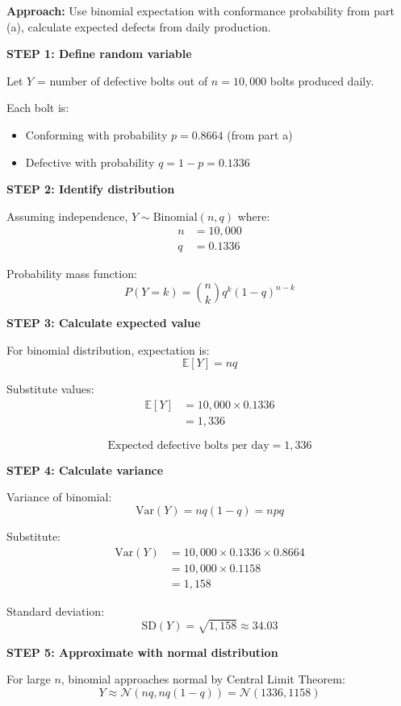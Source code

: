 \documentclass[12pt]{article}
\begin{document}
\begin{solution}

\textbf{Approach:} Use binomial expectation with conformance probability from part (a), calculate expected defects from daily production.

\textbf{STEP 1: Define random variable}

Let $Y$ = number of defective bolts out of $n = 10,000$ bolts produced daily.

Each bolt is:
\begin{itemize}
    \item Conforming with probability $p = 0.8664$ (from part a)
    \item Defective with probability $q = 1 - p = 0.1336$
\end{itemize}

\textbf{STEP 2: Identify distribution}

Assuming independence, $Y \sim \text{Binomial}(n, q)$ where:
\begin{align*}
n &= 10,000 \\
q &= 0.1336
\end{align*}

Probability mass function:
\[
P(Y = k) = \binom{n}{k}q^k(1-q)^{n-k}
\]

\textbf{STEP 3: Calculate expected value}

For binomial distribution, expectation is:
\[
\mathbb{E}[Y] = nq
\]

Substitute values:
\begin{align*}
\mathbb{E}[Y] &= 10,000 \times 0.1336 \\
&= 1,336
\end{align*}

\[
\boxed{\text{Expected defective bolts per day} = 1,336}
\]

\textbf{STEP 4: Calculate variance}

Variance of binomial:
\[
\text{Var}(Y) = nq(1-q) = npq
\]

Substitute:
\begin{align*}
\text{Var}(Y) &= 10,000 \times 0.1336 \times 0.8664 \\
&= 10,000 \times 0.1158 \\
&= 1,158
\end{align*}

Standard deviation:
\[
\text{SD}(Y) = \sqrt{1,158} \approx 34.03
\]

\textbf{STEP 5: Approximate with normal distribution}

For large $n$, binomial approaches normal by Central Limit Theorem:
\[
Y \approx \mathcal{N}(nq, nq(1-q)) = \mathcal{N}(1336, 1158)
\]


\end{solution}
\end{document}
